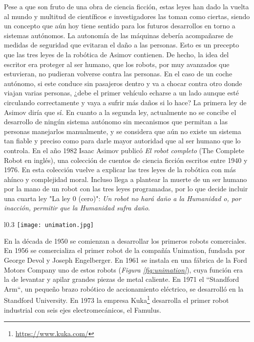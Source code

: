 Pese a que son fruto de una obra de ciencia ficción, estas leyes han dado la vuelta al mundo y multitud de científicos e investigadores las toman como ciertas, siendo un concepto que aún hoy tiene sentido para los futuros desarrollos en torno a sistemas autónomos. La autonomía de las máquinas debería acompañarse de medidas de seguridad que evitaran el daño a las personas. Esto es un precepto que las tres leyes de la robótica de Asimov contienen. De hecho, la idea del escritor era proteger al ser humano, que los robots, por muy avanzados que estuvieran, no pudieran volverse contra las personas. En el caso de un coche autónomo, si este conduce sin pasajeros dentro y va a chocar contra otro donde viajan varias personas, ¿debe el primer vehículo echarse a un lado aunque esté circulando correctamente y vaya a sufrir más daños si lo hace? La primera ley de Asimov diría que sí. En cuanto a la segunda ley, actualmente no se concibe el desarrollo de ningún sistema autónomo sin mecanismos que permitan a las personas manejarlos manualmente, y se considera que aún no existe un sistema tan fiable y preciso como para darle mayor autoridad que al ser humano que lo controla. En el año 1982 Isaac Asimov publicó \textit{El robot completo} (The Complete Robot en inglés), una colección de cuentos de ciencia ficción escritos entre 1940 y 1976. En esta colección vuelve a explicar las tres leyes de la robótica con más ahínco y complejidad moral. Incluso llega a plantear la muerte de un ser humano por la mano de un robot con las tres leyes programadas, por lo que decide incluir una cuarta ley "La ley 0 (cero)": \textit{Un robot no hará daño a la Humanidad o, por inacción, permitir que la Humanidad sufra daño}.

\begin{wrapfigure}{l}{0.3\textwidth}
	\centering
	\texttt{[image: unimation.jpg]}
	\caption{Robot de Unimation usado por Ford en 1961.} \label{fig:unimation}
\end{wrapfigure}
En la década de 1950 se comienzan a desarrollar los primeros robots comerciales. En 1956 se comercializa el primer robot de la compañía Unimation, fundada por George Devol y Joseph Engelberger. En 1961 se instala en una fábrica de la Ford Motors Company uno de estos robots (\textit{Figura \ref{fig:unimation}}), cuya función era la de levantar y apilar grandes piezas de metal caliente. En 1971 el “Standford Arm“, un pequeño brazo robótico de accionamiento eléctrico, se desarrolló en la Standford University. En 1973 la empresa Kuka\footnote{\url{https://www.kuka.com/}} desarrolla el primer robot industrial con seis ejes electromecánicos, el Famulus. 

